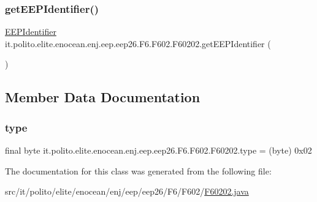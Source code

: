 \subsubsection{\texorpdfstring{get\+E\+E\+P\+Identifier()}{getEEPIdentifier()}}
{\footnotesize\ttfamily \hyperlink{classit_1_1polito_1_1elite_1_1enocean_1_1enj_1_1eep_1_1_e_e_p_identifier}{E\+E\+P\+Identifier} it.\+polito.\+elite.\+enocean.\+enj.\+eep.\+eep26.\+F6.\+F602.\+F60202.\+get\+E\+E\+P\+Identifier (\begin{DoxyParamCaption}{ }\end{DoxyParamCaption})}



\subsection{Member Data Documentation}
\hypertarget{classit_1_1polito_1_1elite_1_1enocean_1_1enj_1_1eep_1_1eep26_1_1_f6_1_1_f602_1_1_f60202_a803fe49f60d7c544a4a8766fbbb1ab49}{}\label{classit_1_1polito_1_1elite_1_1enocean_1_1enj_1_1eep_1_1eep26_1_1_f6_1_1_f602_1_1_f60202_a803fe49f60d7c544a4a8766fbbb1ab49} 
\subsubsection{\texorpdfstring{type}{type}}
{\footnotesize\ttfamily final byte it.\+polito.\+elite.\+enocean.\+enj.\+eep.\+eep26.\+F6.\+F602.\+F60202.\+type = (byte) 0x02\hspace{0.3cm}{\ttfamily [static]}}



The documentation for this class was generated from the following file\+:\begin{DoxyCompactItemize}
\item 
src/it/polito/elite/enocean/enj/eep/eep26/\+F6/\+F602/\hyperlink{_f60202_8java}{F60202.\+java}\end{DoxyCompactItemize}
